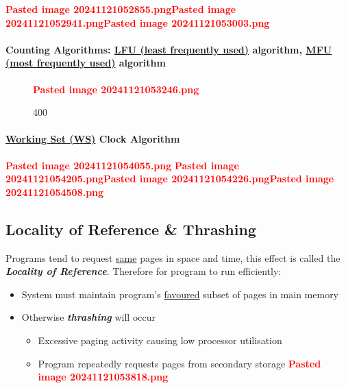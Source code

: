 \textcolor{red}{\textbf{Pasted image 20241121052855.png}}\textcolor{red}{\textbf{Pasted image 20241121052941.png}}\textcolor{red}{\textbf{Pasted image 20241121053003.png}}

\paragraph*{\texorpdfstring{Counting Algorithms: \ul{LFU (least
frequently used)} algorithm, \ul{MFU (most frequently used)}
algorithm}{Counting Algorithms: LFU (least frequently used) algorithm, MFU (most frequently used) algorithm}}

\begin{figure}
\centering
\textcolor{red}{\textbf{Pasted image 20241121053246.png}}
\caption{400}
\end{figure}

\paragraph*{\texorpdfstring{\ul{Working Set (WS)} Clock
Algorithm}{Working Set (WS) Clock Algorithm}}

\textcolor{red}{\textbf{Pasted image 20241121054055.png}}
\textcolor{red}{\textbf{Pasted image 20241121054205.png}}\textcolor{red}{\textbf{Pasted image 20241121054226.png}}\textcolor{red}{\textbf{Pasted image 20241121054508.png}}

\subsection*{Locality of Reference \& Thrashing}

Programs tend to request \ul{same} pages in space and time, this effect
is called the \textbf{\textit{Locality of Reference}}. Therefore for
program to run efficiently:

\begin{itemize}
\tightlist
\item
  System must maintain program's \ul{favoured} subset of pages in main
  memory
\item
  Otherwise \textbf{\textit{thrashing}} will occur

  \begin{itemize}
  \tightlist
  \item
    Excessive paging activity causing low processor utilisation
  \item
    Program repeatedly requests pages from secondary storage
    \textcolor{red}{\textbf{Pasted image 20241121053818.png}}
  \end{itemize}
\end{itemize}

